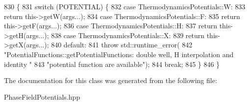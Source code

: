 \begin{DoxyCode}
830                                                                                \{
831   \textcolor{keywordflow}{switch} (POTENTIAL) \{
832     \textcolor{keywordflow}{case} ThermodynamicsPotentials::W:
833       \textcolor{keywordflow}{return} this->getW(args...);
834     \textcolor{keywordflow}{case} ThermodynamicsPotentials::F:
835       \textcolor{keywordflow}{return} this->getF(args...);
836     \textcolor{keywordflow}{case} ThermodynamicsPotentials::H:
837       \textcolor{keywordflow}{return} this->getH(args...);
838     \textcolor{keywordflow}{case} ThermodynamicsPotentials::X:
839       \textcolor{keywordflow}{return} this->getX(args...);
840     \textcolor{keywordflow}{default}:
841       \textcolor{keywordflow}{throw} std::runtime\_error(
842           \textcolor{stringliteral}{"PotentialFunctions::getPotentialFunctions: double well, H interpolation and identity "}
843           \textcolor{stringliteral}{"potential function  are available"});
844       \textcolor{keywordflow}{break};
845   \}
846 \}
\end{DoxyCode}


The documentation for this class was generated from the following file\+:\begin{DoxyCompactItemize}
\item 
Phase\+Field\+Potentials.\+hpp\end{DoxyCompactItemize}
